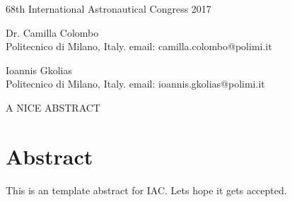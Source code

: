 \documentclass[10pt]{article}
\begin{document}
\begin{center}
68th International Astronautical Congress 2017
\vspace{30pt}


Dr. Camilla Colombo \\
Politecnico di Milano, Italy. email: camilla.colombo@polimi.it

Ioannis Gkolias \\
Politecnico di Milano, Italy. email: ioannis.gkolias@polimi.it


\bigskip

A NICE ABSTRACT
\vspace{12pt}
\end{center}

\section*{Abstract} %
\vspace{-4pt}

This is an template abstract for IAC. Lets hope it gets accepted.
\end{document}

